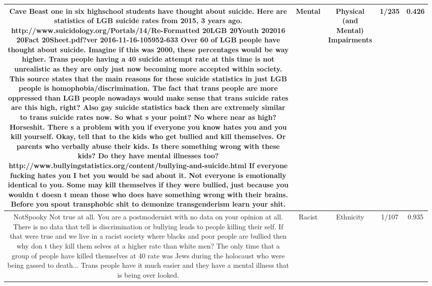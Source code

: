 \documentclass[11pt]{article}
\newlength\mylength
\begin{document}
\begin{center}
\begin{longtable}{|C{.40\mylength}|C{.30\mylength}|C{.15\mylength}|C{.15\mylength}|C{.15\mylength}|}
  Cave Beast one in six highschool students have thought about suicide.  Here are statistics of LGB suicide rates from 2015, 3 years ago.  http://www.suicidology.org/Portals/14/Re-Formatted 20LGB 20Youth 202016 20Fact 20Sheet.pdf?ver 2016-11-16-105952-633  Over 60  of LGB people have thought about suicide.  Imagine if this was 2000, these percentages would be way higher.  Trans people having a 40  suicide attempt rate at this time is not unrealistic as they are only just now becoming more accepted within society.  This source states that the main reasons for these suicide statistics in just LGB people is homophobia/discrimination.  The fact that trans people are more oppressed than LGB people nowadays would make sense that trans suicide rates are this high, right?  Also gay suicide statistics back then are extremely similar to trans suicide rates now.  So what s your point?  No where near as high?  Horseshit.   There s a problem with you if everyone you know hates you and you kill yourself.   Okay, tell that to the kids who get bullied and kill themselves.  Or parents who verbally abuse their kids.  Is there something wrong with these kids?  Do they have mental illnesses too? http://www.bullyingstatistics.org/content/bullying-and-suicide.html  If everyone fucking hates you I bet you would be sad about it.  Not everyone is emotionally identical to you.  Some may kill themselves if they were bullied, just because you wouldn t doesn t mean those who does have something wrong with their brains.  Before you spout transphobic shit to demonize transgenderism learn your shit.  & Mental & Physical (and Mental) Impairments & 1/235 & 0.426 \\  \hline
  NotSpooky Not true at all. You are a postmodernist with no data on your opinion at all. There is no data that tell is discrimination or bullying leads to people killing their self. If that were true  and we live in a racist society where blacks and poor people are bullied then why don t they kill them selves at a higher rate than white men? The only time that a group of people have killed themselves at 40  rate was Jews during the holocaust who were being gassed to death... Trans people have it much easier and they have a mental illness that is being over looked.  & Racist & Ethnicity & 1/107 & 0.935 \\  \hline

\end{longtable}
\end{center}
\end{document}
